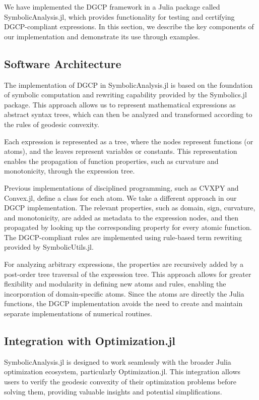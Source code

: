 We have implemented the DGCP framework in a Julia package called SymbolicAnalysis.jl, which provides functionality for testing and certifying DGCP-compliant expressions. In this section, we describe the key components of our implementation and demonstrate its use through examples.

\subsection{Software Architecture}

The implementation of DGCP in SymbolicAnalysis.jl is based on the foundation of symbolic computation and rewriting capability provided by the Symbolics.jl package. This approach allows us to represent mathematical expressions as abstract syntax trees, which can then be analyzed and transformed according to the rules of geodesic convexity.

Each expression is represented as a tree, where the nodes represent functions (or atoms), and the leaves represent variables or constants. This representation enables the propagation of function properties, such as curvature and monotonicity, through the expression tree.

Previous implementations of disciplined programming, such as CVXPY and Convex.jl, define a class for each atom. We take a different approach in our DGCP implementation. The relevant properties, such as domain, sign, curvature, and monotonicity, are added as metadata to the expression nodes, and then propagated by looking up the corresponding property for every atomic function. The DGCP-compliant rules are implemented using rule-based term rewriting provided by SymbolicUtils.jl.

For analyzing arbitrary expressions, the properties are recursively added by a post-order tree traversal of the expression tree. This approach allows for greater flexibility and modularity in defining new atoms and rules, enabling the incorporation of domain-specific atoms. Since the atoms are directly the Julia functions, the DGCP implementation avoids the need to create and maintain separate implementations of numerical routines.

\subsection{Integration with Optimization.jl}

SymbolicAnalysis.jl is designed to work seamlessly with the broader Julia optimization ecosystem, particularly Optimization.jl. This integration allows users to verify the geodesic convexity of their optimization problems before solving them, providing valuable insights and potential simplifications.

